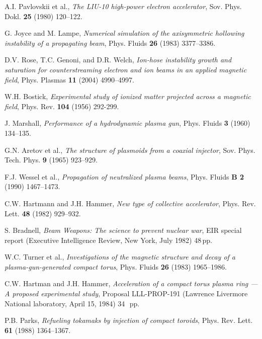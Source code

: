 \documentclass [12pt,a4paper,     ]{report} %
\begin{document}
\begin{enumerate}
 A.I. Pavlovskii et al., \emph{The LIU-10 high-power electron accelerator}, Sov. Phys. Dokl. {\bf 25} (1980) 120--122.


 G. Joyce and M. Lampe, \emph{Numerical simulation of the axisymmetric hollowing instability of a propagating beam}, Phys. Fluids {\bf 26} (1983) 3377--3386.

 D.V. Rose, T.C. Genoni, and D.R. Welch, \emph{Ion-hose instability growth and saturation for counterstreaming electron and ion beams in an applied magnetic field}, Phys. Plasmas {\bf 11} (2004) 4990--4997.



 W.H. Bostick, \emph{Experimental study of ionized matter projected across a magnetic field}, Phys. Rev. {\bf 104} (1956) 292-299.

 J. Marshall, \emph{Performance of a hydrodynamic plasma gun}, Phys. Fluids {\bf 3} (1960) 134--135.

 G.N. Aretov et al., \emph{The structure of plasmoids from a coaxial injector}, Sov. Phys. Tech. Phys. {\bf 9} (1965) 923--929.

 F.J. Wessel et al., \emph{Propagation of neutralized plasma beams}, Phys. Fluids {\bf B 2} (1990) 1467--1473.

 C.W. Hartmann and J.H. Hammer, \emph{New type of collective accelerator}, Phys. Rev. Lett. {\bf 48} (1982) 929--932.

 S. Bradnell, \emph{Beam Weapons: The science to prevent nuclear war}, EIR special report (Executive Intelligence Review, New York, July 1982) 48\,pp.

 W.C. Turner et al., \emph{Investigations of the magnetic structure and decay of a plasma-gun-generated compact torus}, Phys. Fluids {\bf 26} (1983) 1965--1986.

 C.W. Hartman and J.H. Hammer, \emph{Acceleration of a compact torus plasma ring --- A proposed experimental study}, Proposal LLL-PROP-191 (Lawrence Livermore National laboratory, April 15, 1984) 34~\,pp.

 P.B. Parks, \emph{Refueling tokamaks by injection of compact toroids}, Phys. Rev. Lett. {\bf 61} (1988) 1364--1367.


\end{enumerate}
\end{document}
